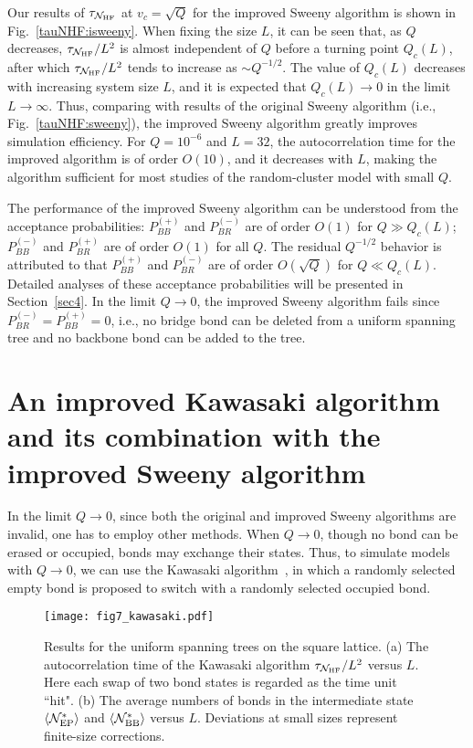 \documentclass[aps,pre,twocolumn,superscriptaddress,longbibliography,floatfix]{revtex4-2}
\begin{document}
Our results of $\tau_{\mathcal{N}_{\rm HF}}$ at $v_c=\sqrt{Q}$ for the improved Sweeny algorithm is shown in Fig.~\ref{tauNHF:isweeny}. 
When fixing the size $L$, it can be seen that, as $Q$ decreases, $\tau_{\mathcal{N}_{\rm HF}}/L^2$ is almost independent of $Q$ before a turning point $Q_c(L)$,
after which $\tau_{\mathcal{N}_{\rm HF}}/L^2$ tends to increase as $\sim Q^{-1/2}$.
The value of $Q_c(L)$ decreases with increasing system size $L$, and it is expected that $Q_c(L) \rightarrow 0$ in the limit $L\rightarrow \infty$. 
Thus, comparing with results of the original Sweeny algorithm (i.e., Fig.~\ref{tauNHF:sweeny}), the improved Sweeny algorithm greatly improves simulation efficiency. 
For $Q=10^{-6}$ and $L=32$, the autocorrelation time for the improved algorithm is of order $O(10)$, and it decreases with $L$, making the algorithm sufficient for most studies of the random-cluster model with small $Q$. 

The performance of the improved Sweeny algorithm can be understood from the acceptance probabilities: 
$P^{(+)}_{BB}$ and $P^{(-)}_{BR}$ are  of order $O(1)$ for $Q \gg Q_c(L)$; $P^{(-)}_{BB}$ and $P^{(+)}_{BR}$ are of order $O(1)$ for all $Q$. 
The residual $Q^{-1/2}$ behavior is attributed to that $P^{(+)}_{BB}$ and $P^{(-)}_{BR}$ are  of order $O(\sqrt{Q})$ for $Q \ll Q_c(L)$.
Detailed analyses of these acceptance probabilities will be presented in Section~\ref{sec4}.
In the limit $Q \rightarrow 0$, the improved Sweeny algorithm fails since $P^{(-)}_{BR}=P^{(+)}_{BB}=0$, i.e., no bridge bond can be deleted from a uniform spanning tree and no backbone bond can be added to the tree.

\section{\label{sec4}An improved Kawasaki algorithm and its combination with the improved Sweeny algorithm}

In the limit $Q \rightarrow 0$, since both the original and improved Sweeny algorithms are invalid, one has to employ other methods.
When $Q \rightarrow 0$, though no bond can be erased or occupied, bonds may exchange their states. Thus, to simulate models with $Q \rightarrow 0$, we can use the Kawasaki algorithm~\cite{kawasaki1966diffusion}, in which a randomly selected empty bond is proposed to switch with a randomly selected occupied bond.

\begin{figure}[t] 
\centering
\texttt{[image: fig7\_kawasaki.pdf]}
\caption{Results for the uniform spanning trees on the square lattice.
(a) The autocorrelation time of the Kawasaki algorithm $\tau_{\mathcal{N}_{\rm HF}}/L^2$ versus $L$. Here each swap of two bond states is regarded as the time unit ``hit".
(b) The average numbers of bonds in the intermediate state $\langle\mathcal{N}^*_{\rm EP} \rangle$ and $\langle\mathcal{N}^*_{\rm BB}\rangle$ versus $L$. 
Deviations at small sizes represent finite-size corrections.
}
\label{kawasaki}
\end{figure}
\end{document}
